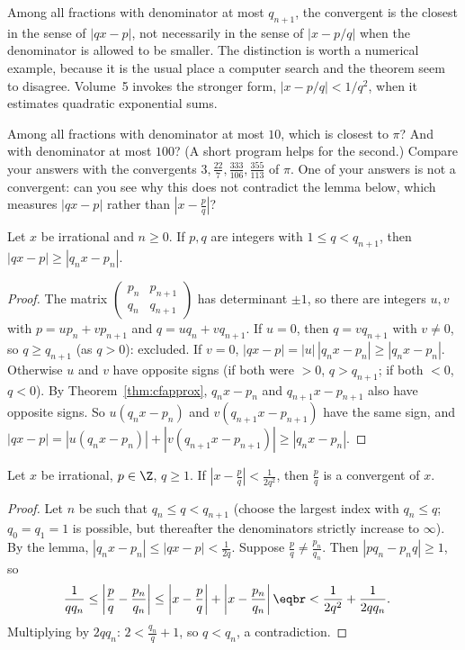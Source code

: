 Among all fractions with denominator at most $q_{n+1}$, the convergent is the closest in the sense of $|qx-p|$, not necessarily in the sense of $|x-p/q|$ when the denominator is allowed to be smaller. The distinction is worth a numerical example, because it is the usual place a computer search and the theorem seem to disagree. Volume~5 invokes the stronger form, $|x-p/q|<1/q^2$, when it estimates quadratic exponential sums.

\begin{think}
Among all fractions with denominator at most $10$, which is closest to $\pi$? And with denominator at most $100$? (A short program helps for the second.) Compare your answers with the convergents $3,\frac{22}7,\frac{333}{106},\frac{355}{113}$ of $\pi$. One of your answers is not a convergent: can you see why this does not contradict the lemma below, which measures $|qx-p|$ rather than $\left|x-\frac pq\right|$?
\end{think}

\begin{lemma}\label{lem:best}
Let $x$ be irrational and $n\ge0$. If $p,q$ are integers with $1\le q<q_{n+1}$, then $|qx-p|\ge|q_nx-p_n|$.
\end{lemma}
\begin{proof}
The matrix $\begin{pmatrix}p_n&p_{n+1}\\q_n&q_{n+1}\end{pmatrix}$ has determinant $\pm1$, so there are integers $u,v$ with $p=up_n+vp_{n+1}$ and $q=uq_n+vq_{n+1}$. If $u=0$, then $q=vq_{n+1}$ with $v\ne0$, so $q\ge q_{n+1}$ (as $q>0$): excluded. If $v=0$, $|qx-p|=|u|\,|q_nx-p_n|\ge|q_nx-p_n|$. Otherwise $u$ and $v$ have opposite signs (if both were $>0$, $q>q_{n+1}$; if both $<0$, $q<0$). By Theorem~\ref{thm:cfapprox}, $q_nx-p_n$ and $q_{n+1}x-p_{n+1}$ also have opposite signs. So $u(q_nx-p_n)$ and $v(q_{n+1}x-p_{n+1})$ have the same sign, and
$|qx-p|=|u(q_nx-p_n)|+|v(q_{n+1}x-p_{n+1})|\ge|q_nx-p_n|$.
\end{proof}

\begin{theorem}[Legendre]\label{thm:legendre}
Let $x$ be irrational, $p\in\Z$, $q\ge1$. If $\left|x-\frac pq\right|<\frac1{2q^2}$, then $\frac pq$ is a convergent of $x$.
\end{theorem}
\begin{proof}
Let $n$ be such that $q_n\le q<q_{n+1}$ (choose the largest index with $q_n\le q$; $q_0=q_1=1$ is possible, but thereafter the denominators strictly increase to $\infty$). By the lemma, $|q_nx-p_n|\le|qx-p|<\frac1{2q}$. Suppose $\frac pq\ne\frac{p_n}{q_n}$. Then $|pq_n-p_nq|\ge1$, so
\[
\begin{aligned}\frac1{qq_n}\le\left|\frac pq-\frac{p_n}{q_n}\right|&\le\left|x-\frac pq\right|+\left|x-\frac{p_n}{q_n}\right|\eqbr<\frac1{2q^2}+\frac1{2qq_n}.\end{aligned}
\]
Multiplying by $2qq_n$: $2<\frac{q_n}q+1$, so $q<q_n$, a contradiction.
\end{proof}

